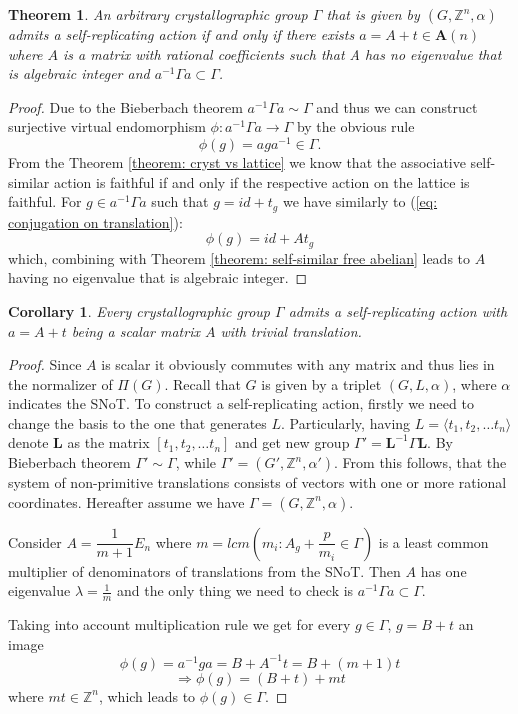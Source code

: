 \documentclass[a4paper,12pt]{amsart}
\newtheorem{theorem}{Theorem}
\newtheorem{corollary}{Corollary}[theorem]
\theoremstyle{definition}
\begin{document}
	
	\begin{theorem} \label{theorem: cryst criterion}
		An arbitrary crystallographic group $\Gamma$ that is given by $(G, \mathbb{Z}^n, \alpha)$ admits a self-replicating action if and only if 
		there exists $a = A + t \in \mathbf{A}(n)$ where $A$ is a matrix with rational coefficients such that A has no eigenvalue that is algebraic integer and  $a^{-1} \Gamma a \subset \Gamma$. 
	\end{theorem}
	\begin{proof}
		Due to the Bieberbach theorem $a^{-1} \Gamma a \sim \Gamma$ and thus we can construct surjective virtual endomorphism $\phi : a^{-1} \Gamma a \rightarrow \Gamma$ by the obvious rule 
		$$
		\phi(g) = a g a^{-1} \in \Gamma.
		$$
		From the Theorem \ref{theorem: cryst vs lattice} we know that the associative self-similar action is faithful if and only if the respective action on the lattice is faithful. For $g \in a^{-1}\Gamma a$  such that $g = id + t_g$ we have similarly to (\ref{eq: conjugation on translation}): 
		$$
		\phi(g) = id + At_g
		$$
		which, combining with Theorem \ref{theorem: self-similar free abelian} leads to $A$ having no eigenvalue that is algebraic integer. 
			 
	\end{proof}

	\begin{corollary} \label{cor: self-replicating action for cryst}
		Every crystallographic group $\Gamma$ admits a self-replicating action with $a=A+t$ being a scalar matrix $A$ with trivial translation.  
	\end{corollary}

	\begin{proof}
		Since $A$ is scalar it obviously commutes with any matrix and thus lies in the normalizer of $\Pi(G)$. Recall that $G$ is given by a triplet $(G, L, \alpha)$, where $\alpha$ indicates the SNoT. To construct a self-replicating action, firstly we need to change the basis to the one that generates $L$. Particularly, having $L = \langle t_1, t_2, \dots t_n \rangle$ denote $\mathbf{L}$ as the matrix $[t_1, t_2, \dots t_n]$ and get new group $\Gamma' = \mathbf{L}^{-1}\Gamma\mathbf{L}$. By Bieberbach theorem $\Gamma' \sim \Gamma$, while $\Gamma' = (G', \mathbb{Z}^n, \alpha')$. From this follows, that the system of non-primitive translations consists of vectors with one or more rational coordinates. Hereafter assume we have $\Gamma = (G, \mathbb{Z}^n, \alpha)$.
		
		Consider $A = \dfrac{1}{m+1}E_n$ where $m = lcm \left(m_i : A_g + \dfrac{p}{m_i} \in \Gamma \right)$ is a least common multiplier of denominators of translations from the SNoT. Then $A$ has one eigenvalue $\lambda = \frac{1}{m}$ and the only thing we need to check is $a^{-1}\Gamma a \subset \Gamma$.
		
		Taking into account multiplication rule we get for every $g \in \Gamma$, $g = B + t$ an image 
		$$
		\phi(g) = a^{-1} g a = B + A^{-1}t = B + (m+1)t
		$$
		$$
		\Rightarrow \phi(g) = (B + t) + mt
		$$
		where $mt \in \mathbb{Z}^n$, which leads to $\phi(g) \in \Gamma$.
	\end{proof}
	
\end{document}
